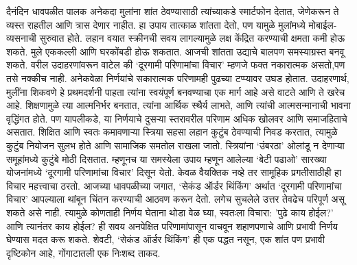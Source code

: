 दैनंदिन धावपळीत पालक अनेकदा मुलांना शांत ठेवण्यासाठी त्यांच्याकडे स्मार्टफोन देतात, जेणेकरून ते व्यस्त राहतील आणि त्रास देणार नाहीत. हा उपाय तात्काळ शांतता देतो, पण यामुळे मुलांमध्ये मोबाईल-व्यसनाची सुरुवात होते. लहान वयात स्क्रीनची  सवय लागल्यामुळे लक्ष केंद्रित करण्याची क्षमता कमी होऊ शकते. मुले एककल्ली आणि घरकोंबडी होऊ शकतात. आजची शांतता उद्याचे बालपण समस्याग्रस्त बनवू शकते.
वरील उदाहरणांवरून वाटेल की ‘दूरगामी परिणामांचा विचार’ म्हणजे फक्त नकारात्मक असतो,पण तसे नक्कीच नाही. अनेकवेळा निर्णयांचे सकारात्मक परिणामही पुढच्या टप्प्यावर उघड होतात. उदाहरणार्थ, मुलींना शिकवणे हे प्रथमदर्शनी पाहता त्यांना स्वयंपूर्ण बनवण्याचा एक मार्ग आहे असे वाटते आणि ते खरेच आहे. शिक्षणामुळे त्या आत्मनिर्भर बनतात, त्यांना आर्थिक स्थैर्य लाभते, आणि त्यांची आत्मसन्मानाची भावना वृद्धिंगत होते. पण यापलीकडे, या निर्णयाचे दुसऱ्या स्तरावरील परिणाम अधिक खोलवर आणि समाजहिताचे असतात. शिक्षित आणि स्वतः कमावणाऱ्या स्त्रिया सहसा लहान कुटुंब ठेवण्याची निवड करतात, त्यामुळे कुटुंब नियोजन सुलभ होते आणि सामाजिक समतोल राखला जातो. स्त्रियांना ‘उंबरठा’ ओलांडू न देणाऱ्या समूहांमध्ये कुटुंबे मोठी दिसतात. म्हणूनच या समस्येला उपाय म्हणून आलेल्या ‘बेटी पढाओ’ सारख्या योजनांमध्ये ‘दूरगामी परिणामांचा विचार’ दिसून येतो. केवळ वैयक्तिक नव्हे तर सामूहिक प्रगतीसाठीही हा विचार महत्त्वाचा ठरतो.
आजच्या धावपळीच्या जगात, ‘सेकंड ऑर्डर थिंकिंग’ अर्थात ‘दूरगामी परिणामांचा विचार’ आपल्याला थांबून चिंतन करण्याची आठवण करून देतो. लगेच सुचलेले उत्तर तेवढेच परिपूर्ण असू शकते असे नाही. त्यामुळे कोणताही निर्णय घेताना थोडा वेळ घ्या, स्वतःला विचारा: 'पुढे काय होईल?' आणि त्यानंतर काय होईल? ही सवय अनपेक्षित परिणामांपासून वाचवून शहाणपणाचे आणि प्रभावी निर्णय घेण्यास मदत करू शकते. शेवटी, ‘सेकंड ऑर्डर थिंकिंग’ ही एक पद्धत नसून, एक शांत पण प्रभावी दृष्टिकोन आहे,  गोंगाटातली एक निःशब्द ताकद.
